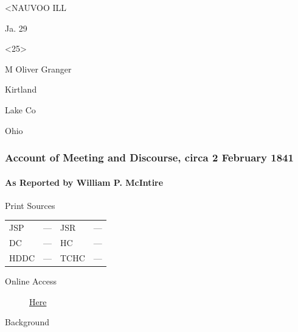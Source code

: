 				<NAUVOO ILL

				Ja. 29

				\begin{tightright}
					<25>
				\end{tightright}

				M Oliver Granger

				Kirtland

				Lake Co

				Ohio
				
		\subsubsection{Account of Meeting and Discourse, circa 2 February 1841}
			\label{EMS-1841-JS-CIR-2-FEB-1841}
			
			\paragraph{As Reported by William P. McIntire}
				\label{EMS-1841-JS-CIR-2-FEB-1841-WM}
			
				\begin{description}
					\item[Print Sources]
				\end{description}

				\begin{tabular}{p{0.5in}p{1in}p{0.5in}p{1in}}
					JSP	 	& ---		& JSR 		& --- \\
					DC	 	& ---		& HC 		& --- \\
					HDDC 	& ---		& TCHC 		& --- \\
				\end{tabular}
				
				\begin{description}
					\item[Online Access] \href{https://www.josephsmithpapers.org/paper-summary/account-of-meeting-and-discourse-circa-2-february-1841/1}{Here}
				\end{description}
				
				\begin{description}
					\item[Background]
				\end{description}
				
